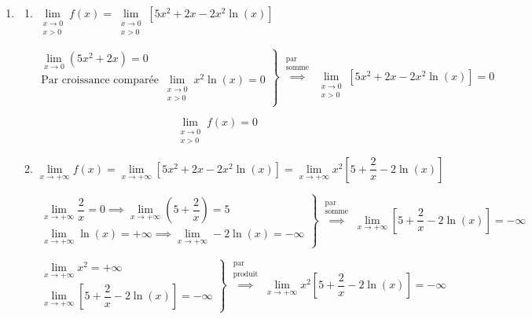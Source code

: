 

\begin{enumerate}
	\item
	\begin{enumerate}
		\item $\lim\limits_{\substack{x \to 0\\x>0}}f(x) = \lim\limits_{\substack{x \to 0\\x>0}}\left[5x^2 + 2x - 2x^2\ln(x)\right]$
		
		\[\left.
		\begin{array}{r}
			\lim\limits_{x \to 0}\left(5x^2+2x\right) = 0\\
			\text{Par croissance comparée}\: \lim\limits_{\substack{x \to 0\\x>0}}x^2\ln(x) = 0
		\end{array}\right\} \overset{\substack{\text{par} \\ \text{somme}}}{\implies} \lim_{\substack{x \to 0\\x>0}}\left[5x^2 + 2x - 2x^2 \ln (x)\right] = 0\]
		
		\[\boxed{\lim_{\substack{x \to 0\\x>0}}f(x) = 0}\]
		\item $\lim\limits_{x \to +\infty}f(x) = \lim\limits_{x \to +\infty}\left[5x^2+2x-2x^2\ln (x)\right] = \lim\limits_{x \to +\infty}x^2\left[5+\dfrac{2}{x}-2\ln(x)\right]$
		
		\[\renewcommand{\arraystretch}{2}
		\left.
		\begin{array}{r}
			\lim\limits_{x \to +\infty}\dfrac{2}{x} = 0 \implies \lim\limits_{x \to +\infty}\left(5+\dfrac{2}{x}\right) = 5 \\
			\lim\limits_{x \to +\infty}\ln(x) = +\infty \implies \lim\limits_{x \to +\infty}-2\ln(x) = -\infty
		\end{array}\right\} \overset{\substack{\text{par} \\ \text{somme}}}{\implies} \lim_{x \to +\infty}\left[5 + \dfrac{2}{x} - 2\ln (x)\right] = -\infty
		\]
		
		\[\renewcommand{\arraystretch}{2}
		\left.
		\begin{array}{r}
			\lim\limits_{x \to +\infty}x^2 = +\infty \\
			\lim\limits_{x \to +\infty}\left[5 + \dfrac{2}{x} - 2\ln (x)\right] = -\infty
		\end{array}\right\} \overset{\substack{\text{par} \\ \text{produit}}}{\implies} \lim_{x \to +\infty}x^2\left[5+\dfrac{2}{x}-2\ln(x)\right] = -\infty
		\]
		

\end{enumerate}
\end{enumerate}
